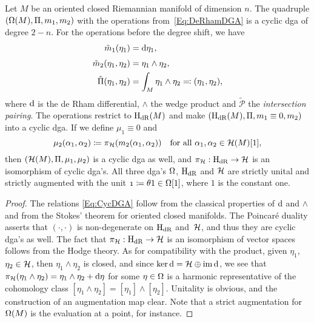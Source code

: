 \documentclass[\MainFolder/Text.tex]{subfiles}
\begin{document}
\begin{Proposition}\label{Prop:DGAs}
Let $M$ be an oriented closed Riemannian manifold of dimension $n$. The quadruple $(\Omega(M), \Pi, m_1, m_2)$ with the operations from~\eqref{Eq:DeRhamDGA} is a cyclic dga of degree $2-n$.
For the operations before the degree shift, we have
\begin{align*}
\tilde{m}_1(\eta_1) & = \mathrm{d} \eta_1, \\[\jot]
\tilde{m}_2(\eta_1, \eta_2) &= \eta_1 \wedge \eta_2, \\ 
\tilde{\Pi}(\eta_1, \eta_2) &=  \int_M \eta_1 \wedge \eta_2 \eqqcolon (\eta_1,\eta_2),
\end{align*}
where $\mathrm{d}$ is the de Rham differential, $\wedge$ the wedge product and $\tilde{\mathcal{P}}$ the \emph{intersection pairing}. 
The operations restrict to $\mathrm{H}_{\mathrm{dR}}(M)$ and make $(\mathrm{H}_{\mathrm{dR}}(M),\Pi,m_1\equiv 0,m_2)$ into a cyclic dga. If we define $\mu_1 \equiv 0$ and
\begin{equation}\label{Eq:HarmProd}
\mu_2(\alpha_1, \alpha_2) \coloneqq \pi_{\mathcal{H}}(m_2(\alpha_1, \alpha_2))\quad \text{for all }\alpha_1, \alpha_2 \in \mathcal{H}(M)[1],
\end{equation}
then $(\mathcal{H}(M), \Pi, \mu_1, \mu_2)$ is a cyclic dga as well, and $\pi_{\mathcal{H}}: \mathrm{H}_{\mathrm{dR}} \rightarrow \mathcal{H}$ is an isomorphism of cyclic dga's. All three dga's $\Omega$, $\mathrm{H}_{\mathrm{dR}}$ and $\mathcal{H}$ are strictly unital and strictly augmented with the unit $\NOne\coloneqq \SuspU 1 \in \DR[1]$, where $1$ is the constant one.
\end{Proposition}

\begin{proof}
The relations \eqref{Eq:CycDGA} follow from the classical properties of $\mathrm{d}$ and $\wedge$ and from the Stokes' theorem for oriented closed manifolds. The Poincar\'e duality asserts that $(\cdot,\cdot)$ is non-degenerate on $\mathrm{H}_{\mathrm{dR}}{}$ and~$\mathcal{H}{}$, and thus they are cyclic dga's as well. The fact that $\pi_{\mathcal{H}} : \mathrm{H}_{\mathrm{dR}}{}\rightarrow \mathcal{H}{}$ is an isomorphism of vector spaces follows from the Hodge theory. As for compatibility with the product, given $\eta_1$, $\eta_2 \in \mathcal{H}{}$, then $\eta_1 \wedge \eta_2$ is closed, and since $\operatorname{ker} \mathrm{d} = \mathcal{H} \oplus \operatorname{im} \mathrm{d}$, we see that $\pi_{\mathcal{H}}(\eta_1 \wedge \eta_2) = \eta_1 \wedge \eta_2 + \mathrm{d} \eta$ for some $\eta\in \Omega$ is a harmonic representative of the cohomology class $[\eta_1 \wedge \eta_2] = [\eta_1] \wedge [\eta_2]$. Unitality is obvious, and the construction of an augmentation map clear. Note that a strict augmentation for $\Omega(M)$ is the evaluation at a point, for instance. 
\end{proof}
\end{document}
